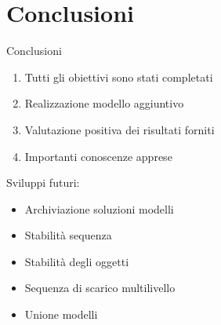 \documentclass{beamer}
\begin{document}
\section{Conclusioni}
\begin{frame}{Conclusioni}
	\begin{enumerate}
		\item Tutti gli obiettivi sono stati completati
		\item Realizzazione modello aggiuntivo
		\item Valutazione positiva dei risultati forniti
		\item Importanti conoscenze apprese
	\end{enumerate}
				
	\vspace{.5em}
	Sviluppi futuri:
	\begin{itemize}
		\item Archiviazione soluzioni modelli
		\item Stabilit\`a sequenza
		\item Stabilit\`a degli oggetti
		\item Sequenza di scarico multilivello
		\item Unione modelli
	\end{itemize}
\end{frame}
\end{document}
